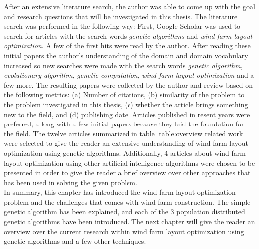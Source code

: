 \noindent After an extensive literature search, the author was able to come up with the goal and research questions that will be investigated in this thesis. The literature search was performed in the following way: First, Google Scholar was used to search for articles with the search words \textit{genetic algorithms} and \textit{wind farm layout optimization}. A few of the first hits were read by the author. After reading these initial papers the author's understanding of the domain and domain vocabulary increased so new searches were made with the search words  \textit{genetic algorithm}, \textit{evolutionary algorithm}, \textit{genetic computation}, \textit{wind farm layout optimization} and a few more. The resulting papers were collected by the author and review based on the following metrics: (a) Number of citations, (b) similarity of the problem to the problem investigated in this thesis, (c) whether the article brings something new to the field, and (d) publishing date. Articles published in resent years were preferred, a long with a few initial papers because they laid the foundation for the field. The twelve articles summarized in table \ref{table:overview related work} were selected to give the reader an extensive understanding of wind farm layout optimization using genetic algorithms. Additionally, 4 articles about wind farm layout optimization using other artificial intelligence algorithms were chosen to be presented in order to give the reader a brief overview over other approaches that has been used in solving the given problem. \\

\noindent In summary, this chapter has introduced the wind farm layout optimization problem and the challenges that comes with wind farm construction. The simple genetic algorithm has been explained, and each of the 3 population distributed genetic algorithms have been introduced. The next chapter will give the reader an overview over the current research within wind farm layout optimization using genetic algorithms and a few other techniques.\\
